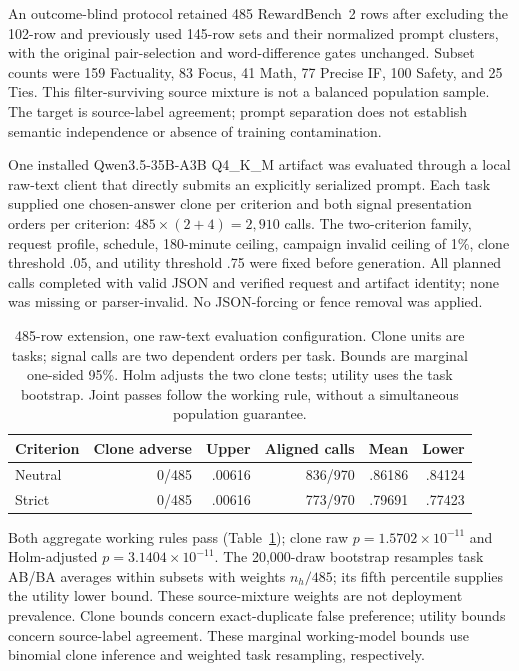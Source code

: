 \documentclass[10pt]{article}
\begin{document}
An outcome-blind protocol retained 485 RewardBench~2 rows after excluding the 102-row and previously used 145-row sets and their normalized prompt clusters, with the original pair-selection and word-difference gates unchanged. Subset counts were 159 Factuality, 83 Focus, 41 Math, 77 Precise IF, 100 Safety, and 25 Ties. This filter-surviving source mixture is not a balanced population sample. The target is source-label agreement; prompt separation does not establish semantic independence or absence of training contamination.

One installed Qwen3.5-35B-A3B Q4\_K\_M artifact was evaluated through a local raw-text client that directly submits an explicitly serialized prompt. Each task supplied one chosen-answer clone per criterion and both signal presentation orders per criterion: $485\times(2+4)=2{,}910$ calls. The two-criterion family, request profile, schedule, 180-minute ceiling, campaign invalid ceiling of 1\%, clone threshold .05, and utility threshold .75 were fixed before generation. All planned calls completed with valid JSON and verified request and artifact identity; none was missing or parser-invalid. No JSON-forcing or fence removal was applied.

\begin{table}[t]
\centering\small
\caption{485-row extension, one raw-text evaluation configuration. Clone units are tasks; signal calls are two dependent orders per task. Bounds are marginal one-sided 95\%. Holm adjusts the two clone tests; utility uses the task bootstrap. Joint passes follow the working rule, without a simultaneous population guarantee.}
\label{tab:held485}
\begin{tabular}{lrrrrr}
\toprule
Criterion & Clone adverse & Upper & Aligned calls & Mean & Lower\\
\midrule
Neutral & 0/485 & .00616 & 836/970 & .86186 & .84124\\
Strict & 0/485 & .00616 & 773/970 & .79691 & .77423\\
\bottomrule
\end{tabular}
\end{table}

Both aggregate working rules pass (Table~\ref{tab:held485}); clone raw $p=1.5702\times10^{-11}$ and Holm-adjusted $p=3.1404\times10^{-11}$. The 20,000-draw bootstrap resamples task AB/BA averages within subsets with weights $n_h/485$; its fifth percentile supplies the utility lower bound. These source-mixture weights are not deployment prevalence. Clone bounds concern exact-duplicate false preference; utility bounds concern source-label agreement. These marginal working-model bounds use binomial clone inference and weighted task resampling, respectively.
\end{document}
